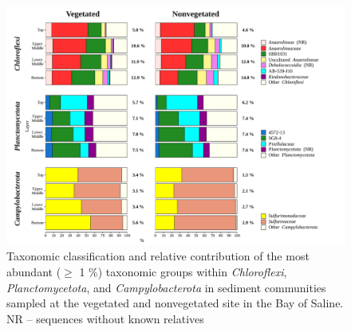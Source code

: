 \documentclass[12pt,]{article}
\begin{document}
\begin{figure}[H]

{\centering \includegraphics[width=1\linewidth]{../results/figures/community_barplot_major_2} 

}

\caption{Taxonomic classification and relative contribution of the most abundant ($\geq$ 1 \si{\percent}) taxonomic groups within \textit{Chloroflexi}, \textit{Planctomycetota}, and \textit{Campylobacterota} in sediment communities sampled at the vegetated and nonvegetated site in the Bay of Saline. NR -- sequences without known relatives\label{community_barplot_major2}}\label{fig:unnamed-chunk-7}
\end{figure}
\end{document}
